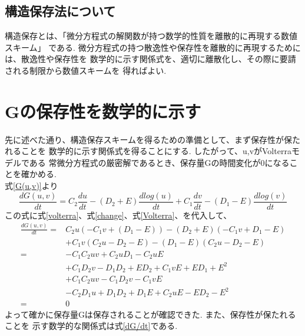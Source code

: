 \documentclass[12pt]{ltjsarticle}
\begin{document}
\subsection{構造保存法について}
構造保存とは、「微分方程式の解関数が持つ数学的性質を離散的に再現する数値スキーム」
である. \cite{furihata} 微分方程式の持つ散逸性や保存性を離散的に再現するためには、散逸性や保存性を
数学的に示す関係式を、適切に離散化し、その際に要請される制限から数値スキームを
得ればよい. \cite{tuchiya}

\section{Gの保存性を数学的に示す}
先に述べた通り、構造保存スキームを得るための準備として、まず保存性が保たれることを
数学的に示す関係式を得ることにする. したがって、u,vがVolterraモデルである
常微分方程式の厳密解であるとき、保存量Gの時間変化が0になることを確かめる. \\
式\ref{G(u,v)}より
\begin{equation}
  \frac{dG(u,v)}{dt} = C_2 \frac{du}{dt}-(D_2 + E)\frac{dlog(u)}{dt} 
                        +C_1\frac{dv}{dt}-(D_1 - E)\frac{dlog(v)}{dt}
    \label{dG/dt}
\end{equation}
この式に式\ref{volterra}、式\ref{change}、式\ref{Volterra}、を代入して、
\begin{equation*}
    \begin{split}
        \frac{dG(u,v)}{dt} = & C_2 u (-C_1 v + (D_1 - E))-(D_2 + E)(-C_1 v + D_1 -E) \\
        &+C_1 v(C_2 u - D_2 -E)-(D_1 - E)(C_2 u - D_2 -E)  \\
        = &-C_1 C_2 uv + C_2 u D_1 - C_2 uE \\
        &+ C_1 D_2 v - D_1 D_2 +E D_2 + C_1 v E + E D_1 + E^2 \\
        &+ C_1 C_2 uv -C_1 D_2 v - C_1 v E \\
        &- C_2 D_1 u + D_1 D_2 + D_1 E + C_2 uE - E D_2 - E^2 \\
        = &0
    \end{split}
  \end{equation*}
よって確かに保存量Gは保存されることが確認できた. また、保存性が保たれることを
示す数学的な関係式は式\ref{dG/dt}である. 
\end{document}
